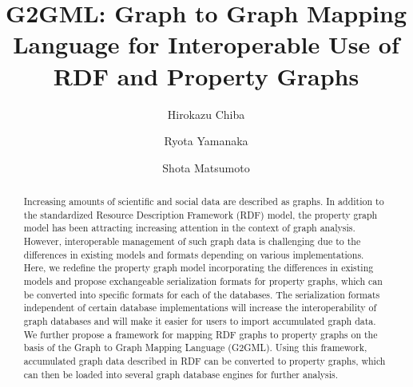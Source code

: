 \documentclass[runningheads]{llncs}
\begin{document}
\newtheorem{defi}[theorem]{Definition}
%
\title{G2GML: Graph to Graph Mapping Language for Interoperable Use of RDF and Property Graphs}
%
%
\author{Hirokazu Chiba \and Ryota Yamanaka \and Shota Matsumoto}
%
%
%
\maketitle              %
%
\begin{abstract}
Increasing amounts of scientific and social data are described as graphs. In addition to the standardized Resource Description Framework (RDF) model, the property graph model has been attracting increasing attention in the context of graph analysis. 
However, interoperable management of such graph data is challenging due to the differences in existing models and formats depending on various implementations. Here, we redefine the property graph model incorporating the differences in existing models and propose exchangeable serialization formats for property graphs, which can be converted into specific formats for each of the databases. 
The serialization formats independent of certain database implementations will increase the interoperability of graph databases and will make it easier for users to import accumulated graph data.
We further propose a framework for mapping RDF graphs to property graphs on the basis of the Graph to Graph Mapping Language (G2GML). Using this framework, accumulated graph data described in RDF can be converted to property graphs, which can then be loaded into several graph database engines for further analysis. 

\end{abstract}
\end{document}
